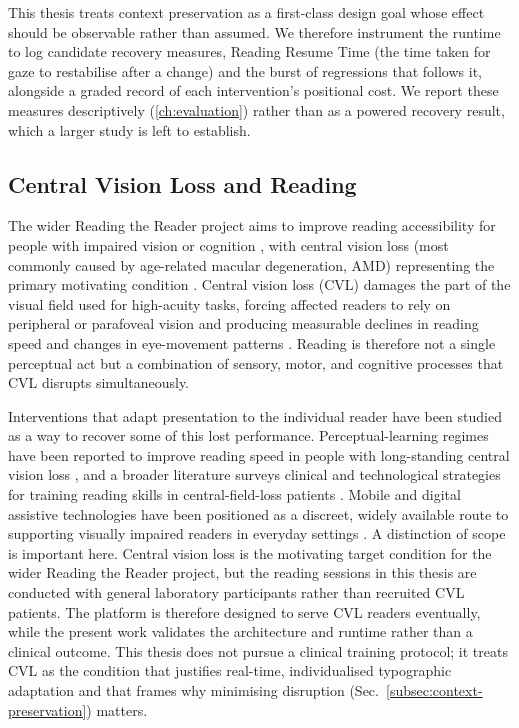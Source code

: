This thesis treats context preservation as a first-class design goal whose effect should be observable rather than assumed.
We therefore instrument the runtime to log candidate recovery measures, Reading Resume Time (the time taken for gaze to restabilise after a change) and the burst of regressions that follows it, alongside a graded record of each intervention's positional cost.
We report these measures descriptively (\cref{ch:evaluation}) rather than as a powered recovery result, which a larger study is left to establish.

\subsection{Central Vision Loss and Reading}
\label{subsec:central-vision-loss}
The wider Reading the Reader project aims to improve reading accessibility for people with impaired vision or cognition \cite{dtucompute2025rtr, nnf2023rtr},
with central vision loss (most commonly caused by age-related macular degeneration, AMD) representing the primary motivating condition \cite{refsgaard2024rtr}.
Central vision loss (CVL) damages the part of the visual field used for high-acuity tasks, forcing affected readers to rely on peripheral or parafoveal vision and producing measurable declines in reading speed and changes in eye-movement patterns \cite{kanonidou2011reading}.
Reading is therefore not a single perceptual act but a combination of sensory, motor, and cognitive processes that CVL disrupts simultaneously.

Interventions that adapt presentation to the individual reader have been studied as a way to recover some of this lost performance.
Perceptual-learning regimes have been reported to improve reading speed in people with long-standing central vision loss \cite{chung2011improving},
and a broader literature surveys clinical and technological strategies for training reading skills in central-field-loss patients \cite{cocomartin2020training}.
Mobile and digital assistive technologies have been positioned as a discreet, widely available route to supporting visually impaired readers in everyday settings \cite{hakobyan2013mobile}.
A distinction of scope is important here.
Central vision loss is the motivating target condition for the wider Reading the Reader project, but the reading sessions in this thesis are conducted with general laboratory participants rather than recruited CVL patients.
The platform is therefore designed to serve CVL readers eventually, while the present work validates the architecture and runtime rather than a clinical outcome.
This thesis does not pursue a clinical training protocol; it treats CVL as the condition that justifies real-time, individualised typographic adaptation and that frames why minimising disruption (Sec.~\ref{subsec:context-preservation}) matters.

